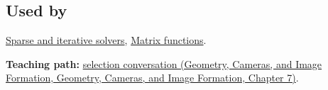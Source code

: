 \subsection{Used by}\label{appendix-221a483bec2d-used-by}

\hyperref[appendix-67c87a3d9e94]{Sparse and iterative solvers}, \hyperref[appendix-0f4bc2bf2b1f]{Matrix functions}.

\textbf{Teaching path:} \href{../03-Geometry-Cameras-and-Image-Formation/main.pdf\#nameddest=02-foundations-ii-ch038-close-the-journey-with-an-algorithm-selection-conversation}{selection conversation (Geometry, Cameras, and Image Formation, Geometry, Cameras, and Image Formation, Chapter 7)}.
